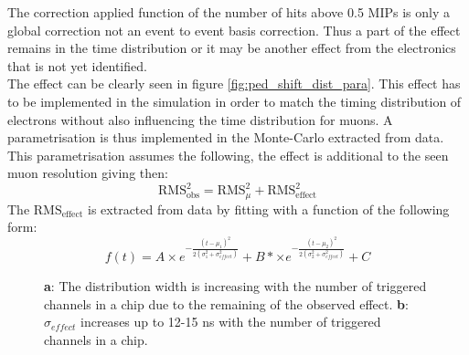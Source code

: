\documentclass[twoside,a4paper,11pt]{article}
\begin{document}
\begin{appendix}
The correction applied function of the number of hits above 0.5 MIPs is only a global correction not an event to event basis correction. Thus a part of the effect remains in the time distribution or it may be another effect from the electronics that is not yet identified.\\
The effect can be clearly seen in figure \ref{fig:ped_shift_dist_para}. This effect has to be implemented in the simulation in order to match the timing distribution of electrons without also influencing the time distribution for muons. A parametrisation is thus implemented in the Monte-Carlo extracted from data. This parametrisation assumes the following, the effect is additional to the seen muon resolution giving then:
\begin{equation*}
\text{RMS}_{\text{obs}}^2 = \text{RMS}_{\mu}^2 + \text{RMS}_{\text{effect}}^2 
\end{equation*}
The $\text{RMS}_{\text{effect}}$ is extracted from data by fitting with a function of the following form:
\begin{equation*}
f(t) = A \times e^{-\frac{(t-\mu_1)^2}{2(\sigma_1^2 + \sigma_{effect}^2)}} + B* \times e^{-\frac{(t-\mu_2)^2}{2(\sigma_2^2 + \sigma_{effect}^2)}} + C
\end{equation*}

\begin{figure}[htbp]
	\hfill
	\caption[]{\textbf{a}: The distribution width is increasing with the number of triggered channels in a chip due to the remaining of the observed effect. \textbf{b}: $\sigma_{effect}$ increases up to 12-15 ns with the number of triggered channels in a chip.}
	\label{fig:mc_para}
\end{figure}


\end{appendix}
\end{document}
